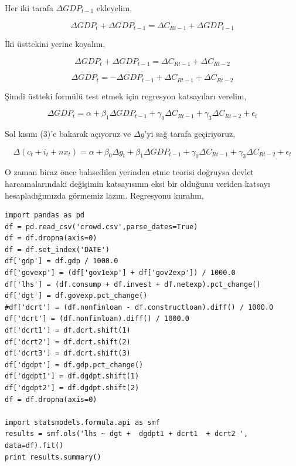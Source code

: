 \documentclass[12pt,fleqn]{article}\usepackage{../../common}
\begin{document}
Her iki tarafa $\Delta GDP_{t-1}$ ekleyelim,

$$ \Delta GDP_t + \Delta GDP_{t-1} = \Delta C_{Rt-1} + \Delta GDP_{t-1} $$

İki üsttekini yerine koyalım,

$$ \Delta GDP_t + \Delta GDP_{t-1} = \Delta C_{Rt-1} + \Delta C_{Rt-2}  $$

$$ \Delta GDP_t = - \Delta GDP_{t-1} + \Delta C_{Rt-1} + \Delta C_{Rt-2}  $$

Şimdi üstteki formülü test etmek için regresyon katsayıları verelim,

$$ \Delta GDP_t = 
\alpha + \beta_1 \Delta GDP_{t-1} + 
\gamma_0 \Delta C_{Rt-1} + \gamma_3 \Delta C_{Rt-2} + \epsilon_t 
$$

Sol kısmı (3)'e bakarak açıyoruz ve $\Delta g$'yi sağ tarafa geçiriyoruz,

$$ 
\Delta (c_t + i_t + nx_t) = 
\alpha + \beta_0 \Delta g_t + \beta_1 \Delta GDP_{t-1} + 
\gamma_0 \Delta C_{Rt-1} + \gamma_3 \Delta C_{Rt-2} + \epsilon_t 
$$

O zaman biraz önce bahsedilen yerinden etme teorisi doğruysa devlet
harcamalarındaki değişimin katsayısının eksi bir olduğunu veriden katsayı
hesapladığımızda görmemiz lazım. Regresyonu kuralım,

\begin{verbatim}
import pandas as pd
df = pd.read_csv('crowd.csv',parse_dates=True)
df = df.dropna(axis=0)
df = df.set_index('DATE')
df['gdp'] = df.gdp / 1000.0
df['govexp'] = (df['gov1exp'] + df['gov2exp']) / 1000.0
df['lhs'] = (df.consump + df.invest + df.netexp).pct_change() 
df['dgt'] = df.govexp.pct_change() 
#df['dcrt'] = (df.nonfinloan - df.constructloan).diff() / 1000.0
df['dcrt'] = (df.nonfinloan).diff() / 1000.0
df['dcrt1'] = df.dcrt.shift(1)
df['dcrt2'] = df.dcrt.shift(2)
df['dcrt3'] = df.dcrt.shift(3)
df['dgdpt'] = df.gdp.pct_change()
df['dgdpt1'] = df.dgdpt.shift(1)
df['dgdpt2'] = df.dgdpt.shift(2)
df = df.dropna(axis=0)

import statsmodels.formula.api as smf
results = smf.ols('lhs ~ dgt +  dgdpt1 + dcrt1  + dcrt2 ', data=df).fit()
print results.summary()
\end{verbatim}
\end{document}
